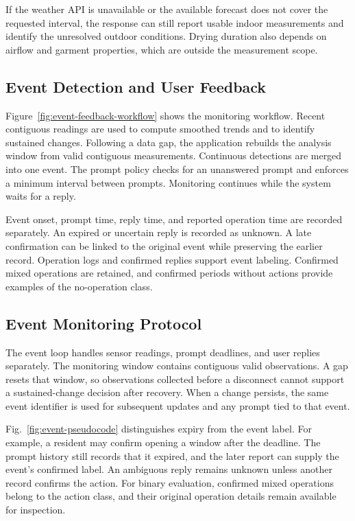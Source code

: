 If the weather API is unavailable or the available forecast does not cover the requested interval, the response can still report usable indoor measurements and identify the unresolved outdoor conditions. Drying duration also depends on airflow and garment properties, which are outside the measurement scope.



\subsection{Event Detection and User Feedback}
Figure~\ref{fig:event-feedback-workflow} shows the monitoring workflow. Recent contiguous readings are used to compute smoothed trends and to identify sustained changes. Following a data gap, the application rebuilds the analysis window from valid contiguous measurements. Continuous detections are merged into one event. The prompt policy checks for an unanswered prompt and enforces a minimum interval between prompts. Monitoring continues while the system waits for a reply.

Event onset, prompt time, reply time, and reported operation time are recorded separately. An expired or uncertain reply is recorded as unknown. A late confirmation can be linked to the original event while preserving the earlier record. Operation logs and confirmed replies support event labeling. Confirmed mixed operations are retained, and confirmed periods without actions provide examples of the no-operation class.



\subsection{Event Monitoring Protocol}
The event loop handles sensor readings, prompt deadlines, and user replies separately. The monitoring window contains contiguous valid observations. A gap resets that window, so observations collected before a disconnect cannot support a sustained-change decision after recovery. When a change persists, the same event identifier is used for subsequent updates and any prompt tied to that event.



Fig.~\ref{fig:event-pseudocode} distinguishes expiry from the event label. For example, a resident may confirm opening a window after the deadline. The prompt history still records that it expired, and the later report can supply the event's confirmed label. An ambiguous reply remains unknown unless another record confirms the action. For binary evaluation, confirmed mixed operations belong to the action class, and their original operation details remain available for inspection.


